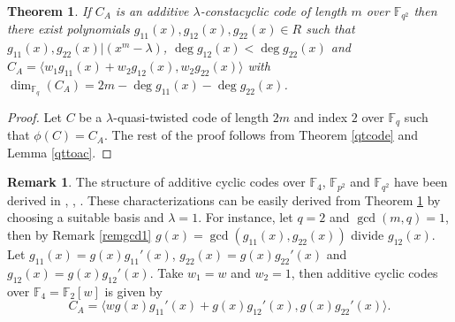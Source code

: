 \documentclass[12 pt]{extarticle}
\numberwithin{equation}{section}
\newtheorem{theorem}{Theorem}[section]
\theoremstyle{definition}
\newtheorem{remark}{Remark}[section]
\begin{document}
\begin{theorem}\label{stca}
If $C_A$ is an additive $\lambda$-constacyclic code of length $m$ over $\mathbb{F}_{q^2}$ then there exist polynomials $g_{11}(x),g_{12}(x),g_{22}(x)\in R$ such that  
$g_{11}(x),g_{22}(x)|(x^m-\lambda)$, $\deg g_{12}(x)<\deg g_{22}(x)$ and $C_A=\langle w_1g_{11}(x)+w_2g_{12}(x),w_2g_{22}(x)\rangle$ with $\dim_{\mathbb{F}_q}(C_A)=2m-\deg g_{11}(x)-\deg g_{22}(x)$.     
\end{theorem}
\begin{proof}
 Let $C$ be a $\lambda$-quasi-twisted code of length $2m$ and index $2$ over $\mathbb{F}_q$ such that $\phi(C)=C_A$. The rest of the proof follows from  Theorem \ref{qtcode} and Lemma \ref{qttoac}. 
\end{proof}

\begin{remark}
The structure of additive cyclic codes over $\mathbb{F}_4$, $\mathbb{F}_{p^2}$ and $\mathbb{F}_{q^2}$ have been derived in \cite[Theorem 3.2]{shi2022}, \cite[Theorem 3.6 (ii)]{reza2025}, \cite[Theorem 3.2]{Verma2024}. These characterizations can be easily derived from Theorem \ref{stca} by choosing a suitable basis and $\lambda=1$. For instance, let $q=2$ and  $\gcd(m,q)=1$, then by Remark \ref{remgcd1} $g(x)=\gcd(g_{11}(x),g_{22}(x))$ divide $g_{12}(x)$. Let $g_{11}(x)=g(x)g_{11}'(x)$, $g_{22}(x)=g(x)g_{22}'(x)$ and $g_{12}(x)=g(x)g_{12}'(x)$. Take $w_1=w$ and $w_2=1$,  then additive cyclic codes over $\mathbb{F}_4=\mathbb{F}_2[w]$ is given by
$$C_A=\langle wg(x)g_{11}'(x)+g(x)g_{12}'(x),g(x)g_{22}'(x)\rangle.$$
\end{remark}
\end{document}
